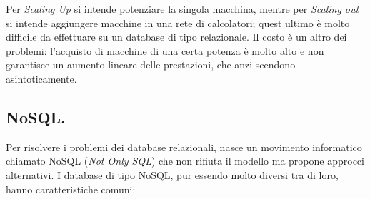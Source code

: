 \documentclass[a4page, 11pt]{article}
\begin{document}
Per \textit{Scaling Up} si intende potenziare la singola macchina, mentre per \textit{Scaling out} si intende aggiungere macchine in una rete di calcolatori; quest ultimo è molto difficile da effettuare su un database di tipo relazionale.
Il costo è un altro dei problemi: l'acquisto di macchine di una certa potenza è molto alto e non garantisce un aumento lineare delle prestazioni, che anzi scendono asintoticamente.
\newline

\subsection{NoSQL.}
Per risolvere i problemi dei database relazionali, nasce un movimento informatico chiamato NoSQL (\textit{Not Only SQL}) che non rifiuta il modello ma propone approcci alternativi. I database di tipo NoSQL, pur essendo molto diversi tra di loro, hanno caratteristiche comuni:
\end{document}

